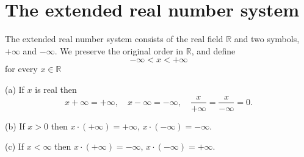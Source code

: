 
\section{The extended real number system}

\begin{myDef}\label{thm:1.23}
    The extended real number system consists of the real field $\mathbb{R}$
and two symbols, $+\infty$ and $-\infty$. We preserve the original order in $\mathbb{R}$, and define
\begin{equation*}
    -\infty <x<+\infty
\end{equation*}
for every $x\in \mathbb{R}$
\end{myDef}

(a) If $x$ is real then
\begin{equation*}
    x+\infty = +\infty,\quad
    x-\infty = -\infty,\quad
    \frac{x}{+\infty}=\frac{x}{-\infty}=0.
\end{equation*}

(b) If $x>0$ then $x\cdot (+\infty) = +\infty$, $x\cdot(-\infty)=-\infty$.

(c) If $x<\infty$ then $x\cdot(+\infty)=-\infty$, $x\cdot(-\infty)= +\infty$.

